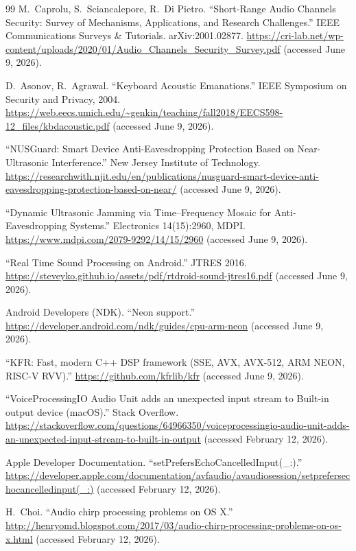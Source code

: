 \documentclass[11pt]{article}
\begin{document}
\begin{thebibliography}{99}
M.~Caprolu, S.~Sciancalepore, R.~Di Pietro. ``Short-Range Audio Channels
Security: Survey of Mechanisms, Applications, and Research Challenges.'' IEEE
Communications Surveys \& Tutorials. arXiv:2001.02877.
\url{https://cri-lab.net/wp-content/uploads/2020/01/Audio_Channels_Security_Survey.pdf}
(accessed June 9, 2026).

D.~Asonov, R.~Agrawal. ``Keyboard Acoustic Emanations.'' IEEE Symposium on
Security and Privacy, 2004.
\url{https://web.eecs.umich.edu/~genkin/teaching/fall2018/EECS598-12_files/kbdacoustic.pdf}
(accessed June 9, 2026).

``NUSGuard: Smart Device Anti-Eavesdropping Protection Based on
Near-Ultrasonic Interference.'' New Jersey Institute of Technology.
\url{https://researchwith.njit.edu/en/publications/nusguard-smart-device-anti-eavesdropping-protection-based-on-near/}
(accessed June 9, 2026).

``Dynamic Ultrasonic Jamming via Time--Frequency Mosaic for
Anti-Eavesdropping Systems.'' Electronics 14(15):2960, MDPI.
\url{https://www.mdpi.com/2079-9292/14/15/2960}
(accessed June 9, 2026).

``Real Time Sound Processing on Android.'' JTRES 2016.
\url{https://steveyko.github.io/assets/pdf/rtdroid-sound-jtres16.pdf}
(accessed June 9, 2026).

Android Developers (NDK). ``Neon support.''
\url{https://developer.android.com/ndk/guides/cpu-arm-neon}
(accessed June 9, 2026).

``KFR: Fast, modern C++ DSP framework (SSE, AVX, AVX-512, ARM NEON,
RISC-V RVV).'' \url{https://github.com/kfrlib/kfr}
(accessed June 9, 2026).

``VoiceProcessingIO Audio Unit adds an unexpected input stream to Built-in
output device (macOS).'' Stack Overflow.
\url{https://stackoverflow.com/questions/64966350/voiceprocessingio-audio-unit-adds-an-unexpected-input-stream-to-built-in-output}
(accessed February 12, 2026).

Apple Developer Documentation. ``setPrefersEchoCancelledInput(\_:).''
\url{https://developer.apple.com/documentation/avfaudio/avaudiosession/setprefersechocancelledinput(_:)}
(accessed February 12, 2026).

H.~Choi. ``Audio chirp processing problems on OS X.''
\url{http://henryomd.blogspot.com/2017/03/audio-chirp-processing-problems-on-os-x.html}
(accessed February 12, 2026).


\end{thebibliography}
\end{document}
